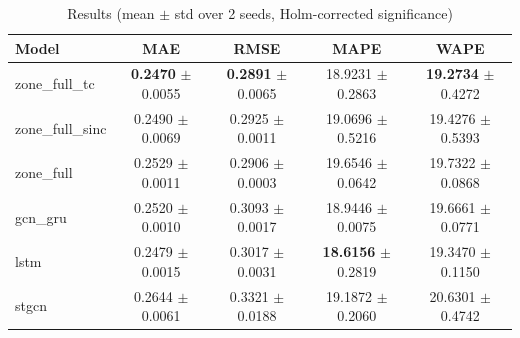 \begin{table}[H]
\centering
\caption{Results (mean $\pm$ std over 2 seeds, Holm-corrected significance)}
\label{tab:results-chrono}
\begin{tabular}{lcccc}
\toprule
Model & MAE & RMSE & MAPE & WAPE \\
\midrule
zone\_full\_tc & \textbf{0.2470} $\pm$ 0.0055 & \textbf{0.2891} $\pm$ 0.0065 & 18.9231 $\pm$ 0.2863 & \textbf{19.2734} $\pm$ 0.4272 \\
zone\_full\_sinc & 0.2490 $\pm$ 0.0069 & 0.2925 $\pm$ 0.0011 & 19.0696 $\pm$ 0.5216 & 19.4276 $\pm$ 0.5393 \\
zone\_full & 0.2529 $\pm$ 0.0011 & 0.2906 $\pm$ 0.0003 & 19.6546 $\pm$ 0.0642 & 19.7322 $\pm$ 0.0868 \\
gcn\_gru & 0.2520 $\pm$ 0.0010 & 0.3093 $\pm$ 0.0017 & 18.9446 $\pm$ 0.0075 & 19.6661 $\pm$ 0.0771 \\
lstm & 0.2479 $\pm$ 0.0015 & 0.3017 $\pm$ 0.0031 & \textbf{18.6156} $\pm$ 0.2819 & 19.3470 $\pm$ 0.1150 \\
stgcn & 0.2644 $\pm$ 0.0061 & 0.3321 $\pm$ 0.0188 & 19.1872 $\pm$ 0.2060 & 20.6301 $\pm$ 0.4742 \\
\bottomrule
\end{tabular}
\end{table}


